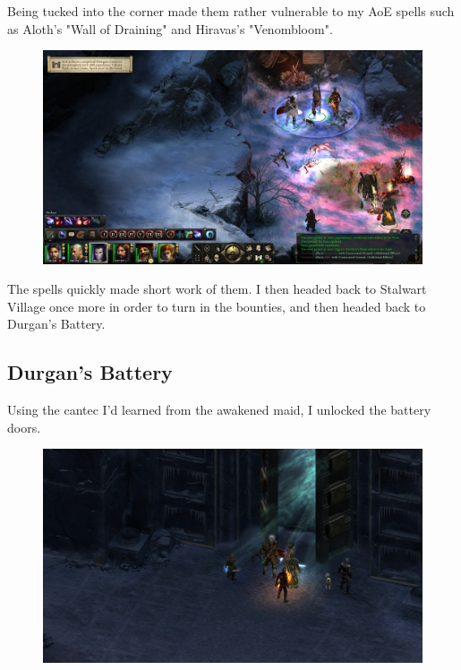 \documentclass{article}
\begin{document}
Being tucked into the corner made them rather vulnerable to my AoE spells such as Aloth's "Wall of Draining" and Hiravas's "Venombloom".

\begin{figure}
\includegraphics[scale=0.33]{files/blog/2019_08_17_poe_potd_wmpt1/2019_08_17_firedorn_2.jpg}
\end{figure}

The spells quickly made short work of them.  I then headed back to Stalwart Village once more in order to turn in the bounties, and then headed back to Durgan's Battery.

\subsection{Durgan's Battery}
Using the cantec I'd learned from the awakened maid, I unlocked the battery doors.

\begin{figure}
\includegraphics[scale=0.33]{files/blog/2019_08_17_poe_potd_wmpt1/2019_08_17_durgans_battery_01.jpg}
\end{figure}
\end{document}
